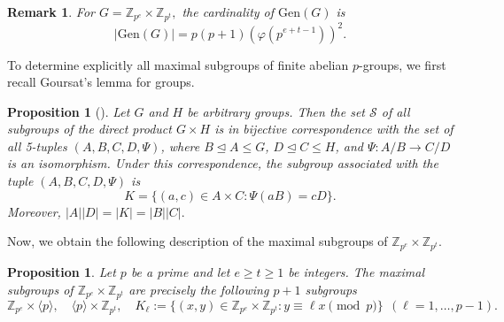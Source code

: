\documentclass[11pt]{article}
\def \Z {{\mathbb Z}}
\newtheorem{pro}[theorem]{Proposition}
\newtheorem{rem}[theorem]{Remark}
\begin{document}
\begin{rem}\label{rem:edge}
 For $G=\Z_{p^e}\times \Z_{p^t},$ the cardinality of $\mathrm{Gen}(G)$ is  $$|\mathrm{Gen}(G)|=p(p+1)(\varphi(p^{e+t-1}))^2.$$
\end{rem}
To determine explicitly all maximal subgroups of finite abelian $p$-groups, we first recall Goursat's lemma for groups.
\begin{pro}[\cite{Goursat}]\label{pro:goursat}
    Let \(G\) and \(H\) be arbitrary groups. Then the set \(\mathcal{S}\) of all subgroups of the direct product \(G \times H\) is in bijective correspondence with the set of all 5-tuples \((A,B,C,D,\Psi)\), where \(B \trianglelefteq A \leq G\), \(D \trianglelefteq C \leq H\), and
\(
\Psi:A/B \longrightarrow C/D
\)
is an isomorphism. Under this correspondence, the subgroup associated with the tuple \((A,B,C,D,\Psi)\) is
\begin{equation}\label{eq:iso}
K=\{(a,c)\in A\times C:\Psi(aB)=cD\}.
\end{equation} Moreover, $|A||D|=|K|=|B||C|.$
\end{pro}

Now, we obtain the following description of the maximal subgroups of $\mathbb{Z}_{p^e} \times \mathbb{Z}_{p^t}$.


\begin{pro}
        Let $p$ be a prime and let $e \geq t \geq 1$ be integers. The maximal subgroups of $\mathbb{Z}_{p^e} \times \mathbb{Z}_{p^t}$ are precisely the following $p+1$ subgroups
        \[
        \mathbb{Z}_{p^e} \times \langle p \rangle, \quad \langle p \rangle \times \mathbb{Z}_{p^t}, \quad K_\ell := \{(x,y) \in \mathbb{Z}_{p^e} \times \mathbb{Z}_{p^t} : y \equiv \ell x \pmod{p}\} \ \ (\ell = 1, \dots, p-1).
        \]
        \end{pro}
        
\end{document}
